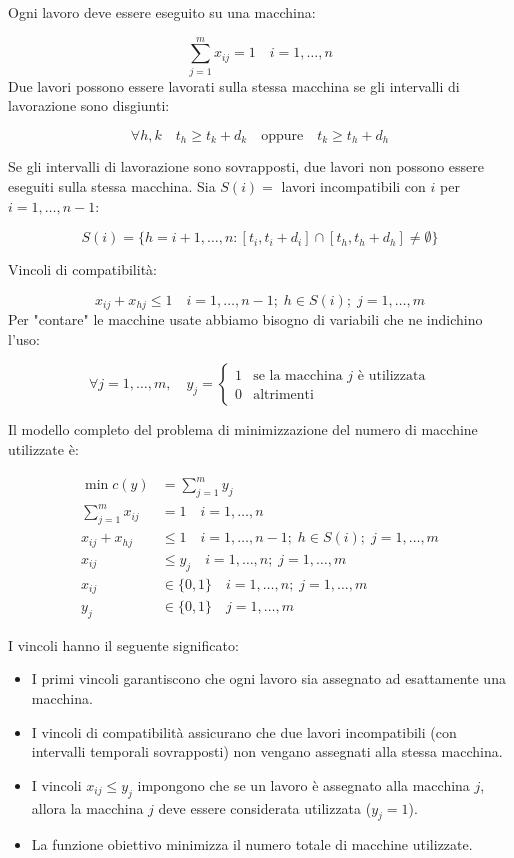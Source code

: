 \documentclass[12pt]{extarticle} %
\begin{document}
\noindent Ogni lavoro deve essere eseguito su una macchina:

\[
\sum_{j=1}^{m} x_{ij} = 1 \quad i = 1, \dots, n
\]
Due lavori possono essere lavorati sulla stessa macchina se gli intervalli di lavorazione sono disgiunti:

\[
\forall h,k \quad t_h \geq t_k + d_k \quad \text{oppure} \quad t_k \geq t_h + d_h
\]

\noindent Se gli intervalli di lavorazione sono sovrapposti, due lavori non possono essere eseguiti sulla stessa macchina. Sia $S(i) =$ lavori incompatibili con $i$ per $i = 1, \ldots, n-1$:

\[
S(i) = \{h = i+1, \ldots, n: [t_i, t_i+d_i] \cap [t_h, t_h+d_h] \neq \emptyset\}
\]

\noindent Vincoli di compatibilità:

\[
x_{ij} + x_{hj} \leq 1 \quad i = 1, \dots, n-1; \; h \in S(i); \; j = 1, \dots, m
\]
Per "contare" le macchine usate abbiamo bisogno di variabili che ne indichino l'uso:

\[
\forall j = 1, \ldots, m, \quad y_j = \begin{cases}
1 & \text{se la macchina } j \text{ è utilizzata} \\
0 & \text{altrimenti}
\end{cases}
\]

\noindent Il modello completo del problema di minimizzazione del numero di macchine utilizzate è:

\[
\begin{aligned}
\min c(y) &= \sum_{j=1}^{m} y_j \\
\sum_{j=1}^{m} x_{ij} &= 1 \quad i = 1, \dots, n \\
x_{ij} + x_{hj} &\leq 1 \quad i = 1, \dots, n-1; \; h \in S(i); \; j = 1, \dots, m \\
x_{ij} &\leq y_j \quad i = 1, \dots, n; \; j = 1, \dots, m \\
x_{ij} &\in \{0,1\} \quad i = 1, \dots, n; \; j = 1, \dots, m \\
y_j &\in \{0,1\} \quad j = 1, \dots, m
\end{aligned}
\]

\noindent I vincoli hanno il seguente significato:
\begin{itemize}
    \item I primi vincoli garantiscono che ogni lavoro sia assegnato ad esattamente una macchina.
    \item I vincoli di compatibilità assicurano che due lavori incompatibili (con intervalli temporali sovrapposti) non vengano assegnati alla stessa macchina.
    \item I vincoli $x_{ij} \leq y_j$ impongono che se un lavoro è assegnato alla macchina $j$, allora la macchina $j$ deve essere considerata utilizzata ($y_j = 1$).
    \item La funzione obiettivo minimizza il numero totale di macchine utilizzate.
\end{itemize}
\end{document}
